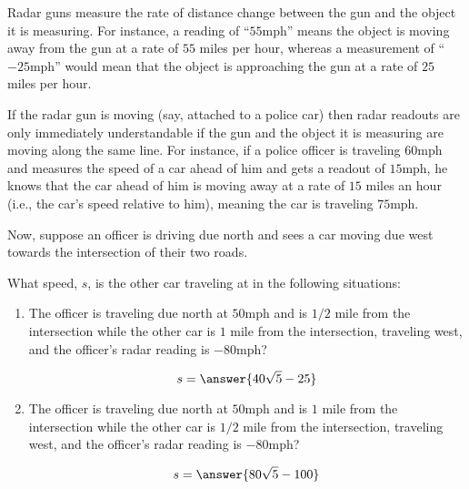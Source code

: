 \documentclass{ximera}
\author{Gregory Hartman \and Matthew Carr}
\begin{document}
\begin{exercise}



Radar guns measure the rate of distance change between the gun and the
object it is measuring. For instance, a reading of ``$55$mph'' means
the object is moving away from the gun at a rate of $55$ miles per
hour, whereas a measurement of ``$-25$mph'' would mean that the object
is approaching the gun at a rate of $25$ miles per hour.

If the radar gun is moving (say, attached to a police car) then radar
readouts are only immediately understandable if the gun and the object
it is measuring are moving along the same line. For instance, if a
police officer is traveling $60$mph and measures the speed of a car
ahead of him and gets a readout of $15$mph, he knows that the car
ahead of him is moving away at a rate of $15$ miles an hour (i.e., the
car's speed relative to him), meaning the car is traveling $75$mph.


Now, suppose an officer is driving due north and sees a car moving due
west towards the intersection of their two roads.

What speed, $s$, is the other car traveling at in the following
situations:
\begin{enumerate}
\item The officer is traveling due north at $50$mph and is $1/2$ mile
  from the intersection while the other car is $1$ mile from the
  intersection, traveling west, and the officer's radar reading is
  $-80$mph? \begin{prompt}\[s = \answer{40\sqrt{5}-25}\]\end{prompt}
\item The officer is traveling due north at $50$mph and is $1$ mile
  from the intersection while the other car is $1/2$ mile from the
  intersection, traveling west, and the officer's radar reading is
  $-80$mph? \begin{prompt}\[s = \answer{80\sqrt{5}-100}\]\end{prompt}
\end{enumerate}


\end{exercise}
\end{document}
